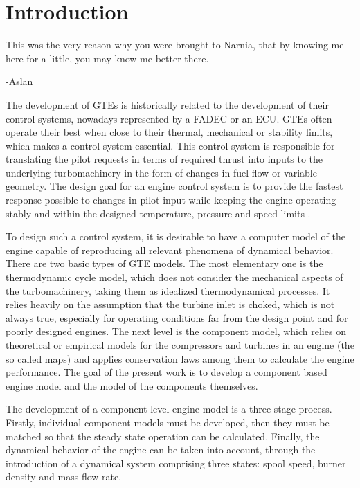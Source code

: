 \chapter{Introduction}
\label{ch:intro}
\epigraph{This was the very reason why you were brought to Narnia, that by knowing me here for a little, you may know me better there.}{-Aslan}

The development of \acp{GTE} is historically related to the development of their control systems, 
nowadays represented by a \ac{FADEC} or an \ac{ECU}. \Acp{GTE} often operate their best when close to their
thermal, mechanical or stability limits, which makes a control system essential.
This control system is responsible for translating the pilot requests in terms of required thrust 
into inputs to the underlying turbomachinery 
in the form of changes in fuel flow or variable geometry.
The design goal for an engine control system is to provide the fastest response possible 
to changes in pilot input
while keeping the engine operating stably and within the designed temperature, pressure and speed limits
\cite{AustinSpangIII1999}.

To design such a control system, it is desirable to have a computer model of the engine 
capable of reproducing all relevant phenomena of dynamical behavior. 
There are two basic types of \ac{GTE} models. 
The most elementary one is the thermodynamic cycle model, which does not consider the mechanical aspects of the turbomachinery, taking them as idealized thermodynamical processes. It relies heavily on the assumption that the turbine inlet is choked, which is not always true, especially for operating conditions far from the design point and for poorly designed engines.
The next level is the component model, which relies on theoretical or empirical models for the compressors and turbines in an engine (the so called maps) and applies conservation laws among them to calculate the engine performance.
The goal of the present work is to develop a component based engine model 
and the model of the components themselves. 

The development of a component level engine model is a three stage process. 
Firstly, individual component models must be developed, 
then they must be matched so that the steady state operation can be calculated.
Finally, the dynamical behavior of the engine can be taken into account, 
through the introduction of a dynamical system comprising three states: 
spool speed, burner density and mass flow rate. 

